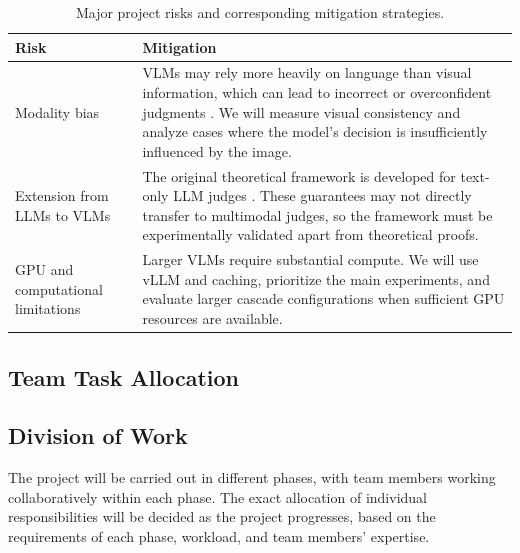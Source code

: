 \documentclass[11pt,a4paper]{article}
\begin{document}
\begin{table}[H]
\centering
\small
\caption{Major project risks and corresponding mitigation strategies.}
\begin{tabularx}{\textwidth}{@{}>{\raggedright\arraybackslash}p{}Y@{}}
\toprule
\textbf{Risk} & \textbf{Mitigation} \\
\midrule

Modality bias &
VLMs may rely more heavily on language than visual information, which can
lead to incorrect or overconfident judgments \cite{zheng2025modality}.
We will measure visual consistency and analyze cases where the model's
decision is insufficiently influenced by the image. \\

Extension from LLMs to VLMs &
The original theoretical framework is developed for text-only LLM judges
\cite{jung2025trust}. These guarantees may not directly transfer
to multimodal judges, so the framework must be experimentally validated apart from theoretical proofs. \\

GPU and computational limitations &
Larger VLMs require substantial compute. We will use vLLM and caching,
prioritize the main experiments, and evaluate larger cascade configurations
when sufficient GPU resources are available. \\


\bottomrule
\end{tabularx}
\end{table}
\subsection{Team Task Allocation}

\subsection{Division of Work}

The project will be carried out in different phases, with team members
working collaboratively within each phase. The exact allocation of
individual responsibilities will be decided as the project progresses,
based on the requirements of each phase, workload, and team members'
expertise.
\end{document}
